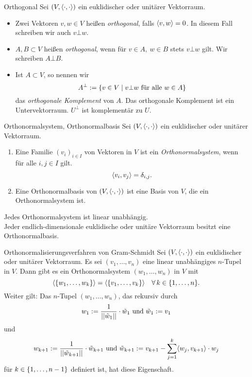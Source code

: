 \documentclass[main.tex]{subfiles}
\begin{document}
\begin{karte}{Orthogonal}
    Sei \( (V, \langle \cdot, \cdot \rangle) \) ein 
    euklidischer oder unitärer Vektorraum. 
    \begin{itemize}
        \item Zwei Vektoren \(v,w\in V\) heißen 
        \textit{orthogonal}, falls 
        \( \langle v, w \rangle = 0 \). In diesem Fall 
        schreiben wir auch \(v\bot w\).
        \item \( A, B \subset V \) heißen \textit{orthogonal}, 
        wenn für \( v\in A,\ w\in B \) stets \(v\bot w\) gilt.
        Wir schreiben \(A\bot B\).
        \item Ist \( A\subset V \), so nennen wir 
        \[ A^\bot := \{ v\in V \;\vert\; v\bot w \text{ für alle } w\in A \} \]
        das \textit{orthogonale Komplement} von \(A\). Das orthogonale 
        Komplement ist ein Untervektorraum. \( U^\bot \) ist 
        komplementär zu \(U\).
    \end{itemize}
\end{karte}

\begin{karte}{Orthonormalsystem, Orthonormalbasis}
    Sei \( (V, \langle \cdot, \cdot \rangle) \) ein 
    euklidischer oder unitärer Vektorraum. 
    \begin{enumerate}
        \item Eine Familie \( (v_i)_{i\in I} \) 
        von Vektoren in \(V\) ist ein 
        \textit{Orthonormalsystem}, wenn für alle 
        \( i,j \in I \) gilt.
        \[ \langle v_i, v_j \rangle = \delta_{i,j}. \]
        \item Eine Orthonormalbasis von 
        \( (V, \langle \cdot, \cdot \rangle) \) ist 
        eine Basis von \(V\), die ein Orthonormalsystem ist.
    \end{enumerate}
    Jedes Orthonormalsystem ist linear unabhängig.\\
    Jeder endlich-dimensionale euklidische oder 
    unitäre Vektorraum besitzt eine Orthonormalbasis.
\end{karte}

\begin{karte}{Orthonormalisierungsverfahren von Gram-Schmidt}
   Sei \( (V, \langle \cdot, \cdot \rangle) \) ein 
   euklidischer oder unitärer Vektorraum. Es sei 
   \( (v_1,\ldots, v_n) \) eine linear unabhängiges 
   \(n\)-Tupel in \(V\). Dann gibt es ein 
   Orthonormalsystem \( (w_1, \ldots, w_n) \) in \(V\) 
   mit 
   \[ \langle \set{w_1, \ldots, w_k} \rangle 
   = \langle \set{ v_1, \ldots, v_k } \rangle \quad 
   \forall k \in \set{1,\ldots, n}. \]
   Weiter gilt: Das \(n\)-Tupel 
   \( (w_1, \ldots, w_n) \), das rekursiv durch 
   \[ w_1 := \frac{1}{\left|\left|\tilde{w}_1\right|\right|} \cdot \tilde{w}_1 
   \text{ und } \tilde{w}_1 := v_1 \]
   und 
   \[ w_{k+1} := \frac{1}{\left|\left| \tilde{w}_{k+1} \right|\right|} 
   \cdot \tilde{w}_{k+1} \text{ und } 
   \tilde{w}_{k+1} := 
   v_{k+1} - \sum_{j=1}^k \langle w_j, v_{k+1} \rangle \cdot w_j \]
   für \( k\in \{1, \ldots, n-1\} \) definiert ist, hat 
   diese Eigenschaft.
\end{karte}
\end{document}
